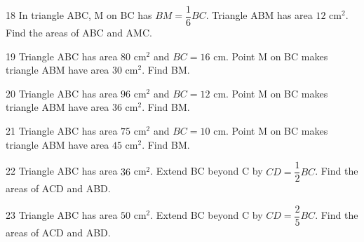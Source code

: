 \gap
\begin{probbox}{18}{\relax}
In triangle ABC, M on BC has $BM=\dfrac{1}{6}BC$. Triangle ABM has area $12$ cm$^2$. Find the areas of ABC and AMC.
\end{probbox}
\gap
\begin{probbox}{19}{\relax}
Triangle ABC has area $80$ cm$^2$ and $BC=16$ cm. Point M on BC makes triangle ABM have area $30$ cm$^2$. Find BM.
\end{probbox}
\gap
\begin{probbox}{20}{\relax}
Triangle ABC has area $96$ cm$^2$ and $BC=12$ cm. Point M on BC makes triangle ABM have area $36$ cm$^2$. Find BM.
\end{probbox}
\gap
\begin{probbox}{21}{\relax}
Triangle ABC has area $75$ cm$^2$ and $BC=10$ cm. Point M on BC makes triangle ABM have area $45$ cm$^2$. Find BM.
\end{probbox}
\gap
\begin{probbox}{22}{\relax}
Triangle ABC has area $36$ cm$^2$. Extend BC beyond C by $CD=\dfrac12BC$. Find the areas of ACD and ABD.
\end{probbox}
\gap
\begin{probbox}{23}{\relax}
Triangle ABC has area $50$ cm$^2$. Extend BC beyond C by $CD=\dfrac25BC$. Find the areas of ACD and ABD.
\end{probbox}
